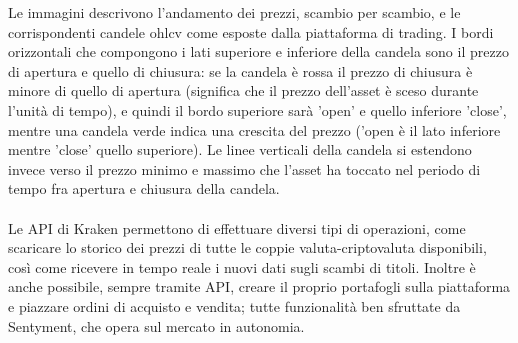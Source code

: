 \documentclass{article}
\numberwithin{equation}{section}
\begin{document}
		Le immagini descrivono l'andamento dei prezzi, scambio per scambio, e le corrispondenti candele ohlcv come esposte dalla piattaforma di trading. I bordi orizzontali che compongono i lati superiore e inferiore della candela sono il prezzo di apertura e quello di chiusura: se la candela è rossa il prezzo di chiusura è minore di quello di apertura (significa che il prezzo dell'asset è sceso durante l'unità di tempo), e quindi il bordo superiore sarà 'open' e quello inferiore 'close', mentre una candela verde indica una crescita del prezzo ('open è il lato inferiore mentre 'close' quello superiore). Le linee verticali della candela si estendono invece verso il prezzo minimo e massimo che l'asset ha toccato nel periodo di tempo fra apertura e chiusura della candela.
		\\~\\
		Le API di Kraken permettono di effettuare diversi tipi di operazioni, come scaricare lo storico dei prezzi di tutte le coppie valuta-criptovaluta disponibili, così come ricevere in tempo reale i nuovi dati sugli scambi di titoli. Inoltre è anche possibile, sempre tramite API, creare il proprio portafogli sulla piattaforma e piazzare ordini di acquisto e vendita; tutte funzionalità ben sfruttate da Sentyment, che opera sul mercato in autonomia.
		
		
		
\end{document}
